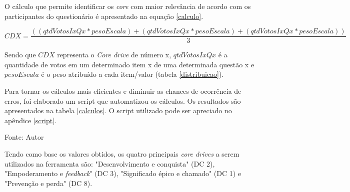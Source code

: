 O cálculo que permite identificar os \textit{core} com maior relevância de acordo com os participantes do questionário é apresentado 
na equação \ref{calculo}.

\begin{equation}
	\label{calculo}
	\scriptstyle CDX = \frac{((qtdVotosIxQx * pesoEscala) + (qtdVotosIxQx * pesoEscala) + (qtdVotosIxQx * pesoEscala)) }{3}
\end{equation}

Sendo que $CDX$ representa o \textit{Core drive} de número x, $qtdVotosIxQx$ é a quantidade de votos em um determinado 
item x de uma determinada questão x e $pesoEscala$ é o peso atribuído a cada item/valor (tabela \ref{distribuicao}).

Para tornar os cálculos mais eficientes e diminuir as chances de ocorrência de erros, foi elaborado um script que automatizou
os cálculos. Os resultados são apresentados na tabela \ref{calculos}. O script utilizado pode ser apreciado no apêndice \ref{script}.
\pagebreak

\begin{table}[h]
	\centering
	\caption{Resultados dos cálculos de relevância.}
	\label{calculos}
	Fonte: Autor
\end{table}

Tendo como base os valores obtidos, os quatro principais \textit{core drives} a serem utilizados na ferramenta são: "Desenvolvimento e conquista" (DC 2), "Empoderamento
e \textit{feedback}" (DC 3), "Significado épico e chamado" (DC 1) e "Prevenção e perda" (DC 8).

